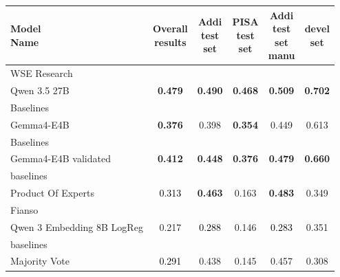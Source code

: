 \begin{tabularx}{\textwidth}{X | c c c c c}
\hline
\makecell[b]{\textbf{Model} \\ \textbf{Name}} & \makecell[b]{\textbf{Overall} \\ \textbf{results}} & \makecell[b]{\textbf{Addi} \\ \textbf{test} \\ \textbf{set}} & \makecell[b]{\textbf{PISA} \\ \textbf{test} \\ \textbf{set}} & \makecell[b]{\textbf{Addi} \\ \textbf{test} \\ \textbf{set} \\ \textbf{manu}} & \makecell[b]{\textbf{devel} \\ \textbf{set}} \\
\hline
WSE Research\\\subcatarrow{}Qwen 3.5 27B & \textbf{\textcolor{BrickRed}{0.479}} & \textbf{\textcolor{BrickRed}{0.490}} & \textbf{\textcolor{BrickRed}{0.468}} & \textbf{\textcolor{BrickRed}{0.509}} & \textbf{\textcolor{White!50!BrickRed}{0.702}} \\
Baselines\\\subcatarrow{}Gemma4-E4B & \textbf{\textcolor{White!50!BrickRed}{0.376}} & \textcolor{White!50!BrickRed}{0.398} & \textbf{\textcolor{White!50!BrickRed}{0.354}} & \textcolor{White!50!BrickRed}{0.449} & \textcolor{White!50!BrickRed}{0.613} \\
Baselines\\\subcatarrow{}Gemma4-E4B validated & \textbf{\textcolor{White!50!BrickRed}{0.412}} & \textbf{\textcolor{BrickRed}{0.448}} & \textbf{\textcolor{White!50!BrickRed}{0.376}} & \textbf{\textcolor{BrickRed}{0.479}} & \textbf{\textcolor{White!50!BrickRed}{0.660}} \\
baselines\\\subcatarrow{}Product Of Experts & \textcolor{Black}{0.313} & \textbf{\textcolor{BrickRed}{0.463}} & \textcolor{White!50!NavyBlue}{0.163} & \textbf{\textcolor{BrickRed}{0.483}} & \textcolor{White!50!NavyBlue}{0.349} \\
Fianso\\\subcatarrow{}Qwen 3 Embedding 8B LogReg & \textcolor{White!50!NavyBlue}{0.217} & \textcolor{Black}{0.288} & \textcolor{White!50!NavyBlue}{0.146} & \textcolor{Black}{0.283} & \textcolor{White!50!NavyBlue}{0.351} \\
baselines\\\subcatarrow{}Majority Vote & \textcolor{Black}{0.291} & \textcolor{BrickRed}{0.438} & \textcolor{White!50!NavyBlue}{0.145} & \textcolor{BrickRed}{0.457} & \textcolor{White!50!NavyBlue}{0.308} \\

\end{tabularx}
